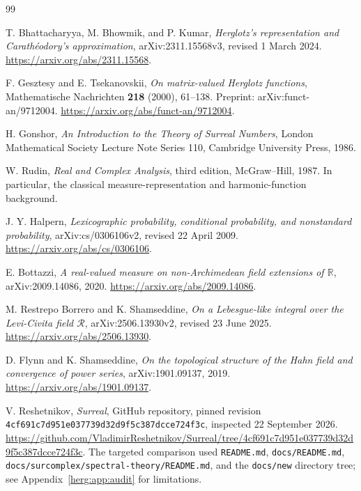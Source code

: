 \documentclass[11pt,letterpaper]{article}
\theoremstyle{definition}
\newcommand{\R}{\mathbb R}\newcommand{\C}{\mathbb C}
\numberwithin{equation}{section}
\begin{document}
\clearpage
\begin{thebibliography}{99}
\raggedright
{}

T. Bhattacharyya, M. Bhowmik, and P. Kumar,
\emph{Herglotz's representation and Carath\'eodory's approximation},
arXiv:2311.15568v3, revised 1 March 2024.
\url{https://arxiv.org/abs/2311.15568}.

F. Gesztesy and E. Tsekanovskii,
\emph{On matrix-valued Herglotz functions},
Mathematische Nachrichten \textbf{218} (2000), 61--138.
Preprint: arXiv:funct-an/9712004.
\url{https://arxiv.org/abs/funct-an/9712004}.

H. Gonshor, \emph{An Introduction to the Theory of Surreal Numbers},
London Mathematical Society Lecture Note Series 110,
Cambridge University Press, 1986.

W. Rudin, \emph{Real and Complex Analysis}, third edition,
McGraw--Hill, 1987. In particular, the classical measure-representation and harmonic-function background.

J. Y. Halpern,
\emph{Lexicographic probability, conditional probability, and nonstandard probability},
arXiv:cs/0306106v2, revised 22 April 2009.
\url{https://arxiv.org/abs/cs/0306106}.

E. Bottazzi,
\emph{A real-valued measure on non-Archimedean field extensions of $\R$},
arXiv:2009.14086, 2020.
\url{https://arxiv.org/abs/2009.14086}.

M. Restrepo Borrero and K. Shamseddine,
\emph{On a Lebesgue-like integral over the Levi-Civita field $\mathcal R$},
arXiv:2506.13930v2, revised 23 June 2025.
\url{https://arxiv.org/abs/2506.13930}.

D. Flynn and K. Shamseddine,
\emph{On the topological structure of the Hahn field and convergence of power series},
arXiv:1901.09137, 2019.
\url{https://arxiv.org/abs/1901.09137}.

V. Reshetnikov, \emph{Surreal}, GitHub repository, pinned revision
\texttt{4cf691c7d951e037739d32d9f5c387dcce724f3c},
inspected 22 September 2026.
\url{https://github.com/VladimirReshetnikov/Surreal/tree/4cf691c7d951e037739d32d9f5c387dcce724f3c}.
The targeted comparison used \texttt{README.md}, \texttt{docs/README.md},
\texttt{docs/surcomplex/spectral-theory/README.md}, and the \texttt{docs/new} directory tree; see Appendix~\ref{herg:app:audit} for limitations.

\end{thebibliography}
\end{document}
